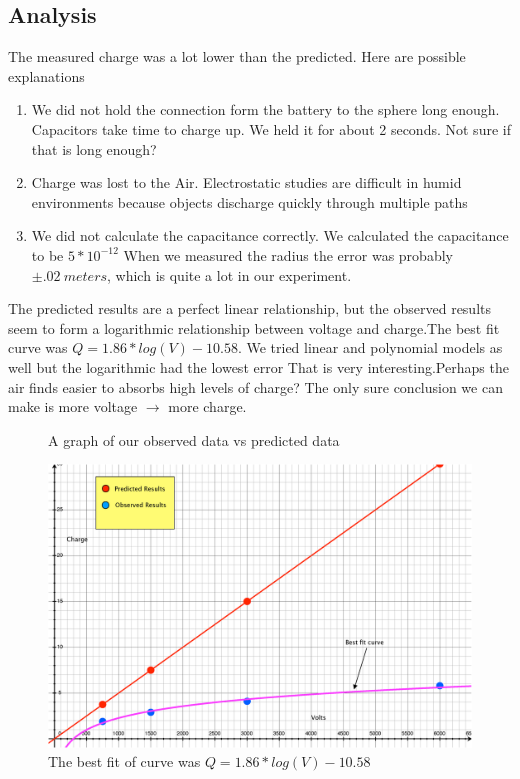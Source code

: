 \documentclass[12pt]{article}
\begin{document}
\subsection*{Analysis}
The measured charge was a lot lower than the predicted. Here are possible explanations
\begin{enumerate}
	\item 
	We did not hold the connection form the battery to the sphere long enough. Capacitors take time to charge up. We held it for about 2 seconds. Not sure if that is long enough?
	\item Charge was lost to the Air. Electrostatic studies are difficult in humid environments because objects discharge quickly through multiple paths 
	\item We did not calculate the capacitance correctly. We calculated the capacitance to be $5 * 10^{-12}$ When we measured the radius the error was probably $\pm .02 \ meters$, which is quite a lot in our experiment.
\end{enumerate}
The predicted results are a perfect linear relationship, but the observed results seem to form a logarithmic relationship between voltage and charge.The best fit curve was $Q=1.86*log(V)-10.58$. We tried linear and polynomial models as well but the logarithmic had the lowest error That is very interesting.Perhaps the air finds easier to absorbs high levels of charge? The only sure conclusion we can make is more voltage $\rightarrow$ more charge.
\begin{figure}[h]
	 \centering
	 \caption{A graph of our observed data vs predicted data}
	 \includegraphics[scale = .4]{ResultsGraph}
	 \caption{The best fit of curve was $Q=1.86*log(V)-10.58$ }
\end{figure}
\end{document}
